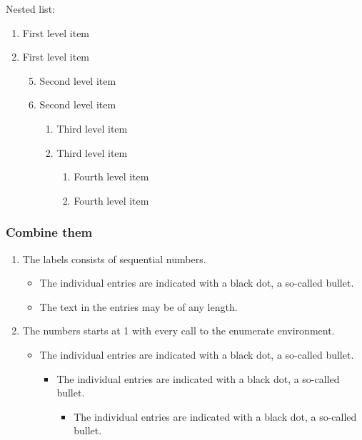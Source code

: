 \documentclass{article}				%
\begin{document}
Nested list:

\renewcommand{\labelenumii}{\Roman{enumii}}
\begin{enumerate}
	\item First level item
	\item First level item
	\begin{enumerate}
		\setcounter{enumii}{4}
		\item Second level item
		\item Second level item
		\begin{enumerate}
			\item Third level item
			\item Third level item
			\begin{enumerate}
				\item Fourth level item
				\item Fourth level item
			\end{enumerate}
		\end{enumerate}
	\end{enumerate}
\end{enumerate}

\subsubsection{Combine them}

\begin{enumerate}
	\item The labels consists of sequential numbers.
	\begin{itemize}
		\item The individual entries are indicated with a black dot, a so-called bullet.
		\item The text in the entries may be of any length.
	\end{itemize}
	\item The numbers starts at 1 with every call to the enumerate environment.
	\begin{itemize}
		\item The individual entries are indicated with a black dot, a so-called bullet.
		\begin{itemize}
			\item The individual entries are indicated with a black dot, a so-called bullet.
			\begin{itemize}
				\item The individual entries are indicated with a black dot, a so-called bullet.
			\end{itemize}
		\end{itemize}
	\end{itemize}
\end{enumerate}
\end{document}
